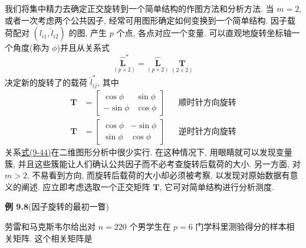 我们将集中精力去确定正交旋转到一个简单结构的作图方法和分析方法. 当 $m=2$, 或者一次考虑两个公共因子, 经常可用图形确定如何变换到一个简单结构. 因子载荷配对 $(\hat{l}_{i1},\hat{l}_{i2})$ 的图, 产生 $p$ 个点, 各点对应一个变量. 可以直观地旋转坐标轴一个角度(称为 $\phi$)并且从关系式
\label{eq:9-44}
\begin{equation}
\underset{(p\times 2)}{\hat{\mathbf{L}}^*}=\underset{(p\times 2)}{\hat{\mathbf{L}}}\ \underset{(2\times 2)}{\mathbf{T}} \tag{9-44}
\end{equation}
决定新的旋转了的载荷 $\hat{l}^*_{ij}$, 其中
\[
\begin{aligned}
\mathbf{T}&=\begin{bmatrix}\cos\phi&\sin\phi\\-\sin\phi&\cos\phi\end{bmatrix} &&\text{顺时针方向旋转}\\[4pt]
\mathbf{T}&=\begin{bmatrix}\cos\phi&-\sin\phi\\\sin\phi&\cos\phi\end{bmatrix} &&\text{逆时针方向旋转}
\end{aligned}
\]
关系\hyperref[eq:9-44]{式(9-44)}在二维图形分析中很少实行. 在这种情况下, 用眼睛就可以发现变量簇, 并且这些簇能让人们确认公共因子而不必考查旋转后载荷的大小. 另一方面, 对 $m>2$, 不易看到方向, 而旋转后载荷的大小却必须被考察, 以发现对原始数据有意义的阐述. 应立即考虑选取一个正交矩阵 $\mathbf{T}$, 它可对简单结构进行分析测度.

\noindent\textbf{例 9.8}\quad (因子旋转的最初一瞥)

劳雷和马克斯韦尔给出对 $n=220$ 个男学生在 $p=6$ 门学科里测验得分的样本相关矩阵. 这个相关矩阵是
